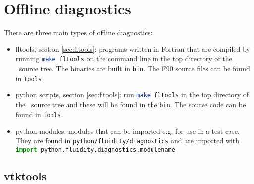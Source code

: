 
\section{Offline diagnostics}
\label{sec:offline_diagnostics}

There are three main types of offline diagnostics:
\begin{itemize}
\item fltools, section \ref{sec:fltools}: programs written in Fortran that are compiled by running \lstinline[language = bash]+make fltools+ on the command line in the top directory of the \fluidity\ source tree. The binaries are built in \lstinline[language = bash]+bin+. The F90 source files can be found in \lstinline[language = bash]+tools+
\item python scripts, section \ref{sec:fltools}: run \lstinline[language = bash]+make fltools+ in the top directory of the \fluidity\ source tree and these will be found in the \lstinline[language = bash]+bin+. The source code can be found in \lstinline[language = bash]+tools+.
\item python modules: modules that can be imported e.g. for use in a test case. They are found in \lstinline[language = XML]+python/fluidity/diagnostics+ and are imported with  \\ \lstinline[language = python]+import python.fluidity.diagnostics.modulename+
\end{itemize}

\subsection{vtktools}
\label{sec:diagnostics_vtk_tools}

